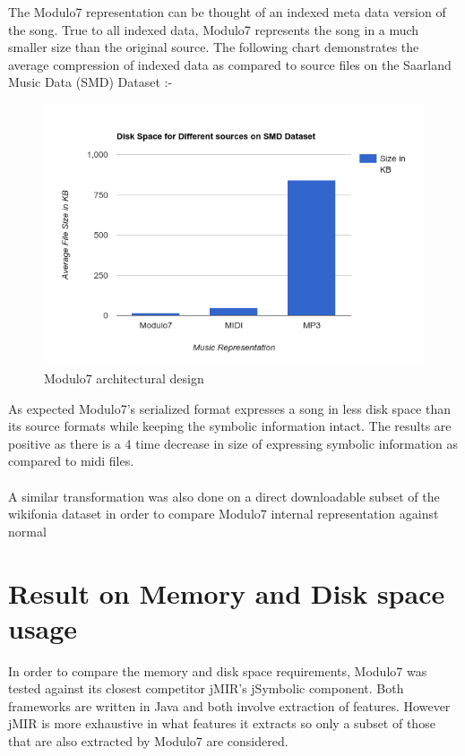 \noindent The Modulo7 representation can be thought of an indexed meta data version of the song. True to all indexed data, Modulo7 represents the song in a much smaller size than the original source. The following chart demonstrates the average compression of indexed data as compared to source files on the Saarland Music Data (SMD) Dataset \cite{saarlandmsd}:-
\begin{figure}
\centering
\includegraphics[width=\textwidth]{Modulo7SMDBarGraph.png}
\makeatletter
\let\@currsize\normalsize
\caption{Modulo7 architectural design}
\label{fig:figure}
\end{figure}
As expected Modulo7's serialized format expresses a song in less disk space than its source formats while keeping the symbolic information intact. The results are positive as there is a 4 time decrease in size of expressing symbolic information as compared to midi files. \\\\
A similar transformation was also done on a direct downloadable subset of the wikifonia dataset in order to compare Modulo7 internal representation against normal 

\section{Result on Memory and Disk space \\ usage}

\noindent In order to compare the memory and disk space requirements, Modulo7 was tested against its closest competitor jMIR's \cite{jMIR} jSymbolic component. Both frameworks are written in Java and both involve extraction of features. However jMIR is more exhaustive in what features it extracts so only a subset of those that are also extracted by Modulo7 are considered. 

